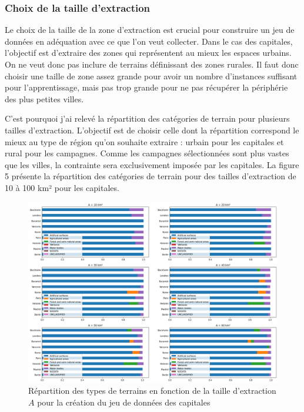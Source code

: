 \subsubsection{Choix de la taille d'extraction}

Le choix de la taille de la zone d'extraction est crucial pour construire un jeu de données en adéquation avec ce que l'on veut collecter.
Dans le cas des capitales, l'objectif est d'extraire des zones qui représentent au mieux les espaces urbains.
On ne veut donc pas inclure de terrains définissant des zones rurales.
Il faut donc choisir une taille de zone assez grande pour avoir un nombre d'instances suffisant pour l'apprentissage, mais pas trop grande pour ne pas récupérer la périphérie des plus petites villes.

C'est pourquoi j'ai relevé la répartition des catégories de terrain pour plusieurs tailles d'extraction.
L'objectif est de choisir celle dont la répartition correspond le mieux au type de région qu'on souhaite extraire : urbain pour les capitales et rural pour les campagnes.
Comme les campagnes sélectionnées sont plus vastes que les villes, la contrainte sera exclusivement imposée par les capitales.
La figure 5 présente la répartition des catégories de terrain pour des tailles d'extraction de 10 à 100 km² pour les capitales.


\begin{figure}
    \centering
    \includegraphics[width=\textwidth]{figures/taille-extraction}
    \caption{Répartition des types de terrains en fonction de la taille d'extraction $A$ pour la création du jeu de données des capitales}
\end{figure}



